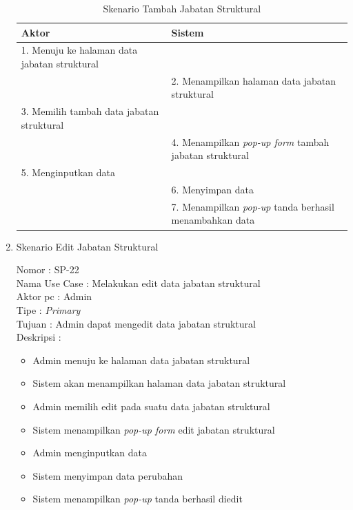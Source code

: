 \begin{enumerate}
\begin{itemize}
\end{itemize}

\begin{table}
	\caption{Skenario Tambah Jabatan Struktural}
	\centering
	\begin{tabular}{ | p{60mm} | p{68mm} |}
		\hline 
		\textbf{Aktor} & \textbf{Sistem} \\
		\hline
		
		1.	Menuju ke halaman data jabatan struktural &  \\
		
		\hline
		
		&  2.	Menampilkan halaman data jabatan struktural\\
		
		\hline
		
		3. Memilih tambah data jabatan struktural& \\
		
		\hline
		
		& 4.	Menampilkan \textit{pop-up form} tambah jabatan struktural\\
		
		\hline
		
		5.	Menginputkan data  & \\
		\hline
		
		& 6.	Menyimpan data \\
		\hline
		
		& 7.	Menampilkan \textit{pop-up} tanda berhasil menambahkan data \\
		\hline
		
	\end{tabular}
\end{table}

\item Skenario Edit Jabatan Struktural

Nomor \kern 3.6pc : SP-22 \\
Nama Use Case : Melakukan edit data jabatan struktural \\
Aktor  pc : Admin \\
Tipe \kern 4.6pc : \textit{Primary} \\
Tujuan \kern 3.6pc : Admin dapat mengedit data jabatan struktural\\
Deskripsi \kern 2.5pc : 

\begin{itemize}
	\item Admin menuju ke halaman data jabatan struktural
	\item Sistem akan menampilkan halaman data jabatan struktural
	\item Admin memilih edit pada suatu data jabatan struktural
	\item Sistem menampilkan \textit{pop-up form} edit jabatan struktural
	\item Admin menginputkan data
	\item Sistem menyimpan data perubahan
	\item Sistem menampilkan \textit{pop-up} tanda berhasil diedit
	

\end{itemize}
\end{enumerate}
